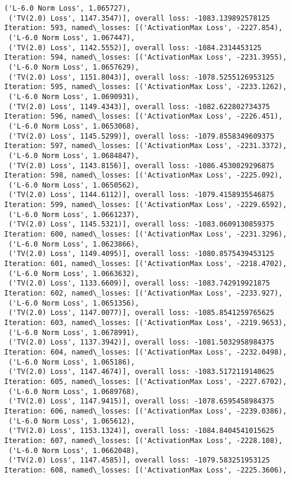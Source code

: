 \documentclass[10pt]{article}
\begin{document}
\begin{Verbatim}[commandchars=\\\{\}]
 ('L-6.0 Norm Loss', 1.065727),
 ('TV(2.0) Loss', 1147.3547)], overall loss: -1083.139892578125
Iteration: 593, named\_losses: [('ActivationMax Loss', -2227.854),
 ('L-6.0 Norm Loss', 1.067447),
 ('TV(2.0) Loss', 1142.5552)], overall loss: -1084.2314453125
Iteration: 594, named\_losses: [('ActivationMax Loss', -2231.3955),
 ('L-6.0 Norm Loss', 1.0657629),
 ('TV(2.0) Loss', 1151.8043)], overall loss: -1078.5255126953125
Iteration: 595, named\_losses: [('ActivationMax Loss', -2233.1262),
 ('L-6.0 Norm Loss', 1.0690931),
 ('TV(2.0) Loss', 1149.4343)], overall loss: -1082.622802734375
Iteration: 596, named\_losses: [('ActivationMax Loss', -2226.451),
 ('L-6.0 Norm Loss', 1.0653068),
 ('TV(2.0) Loss', 1145.5299)], overall loss: -1079.8558349609375
Iteration: 597, named\_losses: [('ActivationMax Loss', -2231.3372),
 ('L-6.0 Norm Loss', 1.0684847),
 ('TV(2.0) Loss', 1143.8156)], overall loss: -1086.4530029296875
Iteration: 598, named\_losses: [('ActivationMax Loss', -2225.092),
 ('L-6.0 Norm Loss', 1.0650562),
 ('TV(2.0) Loss', 1144.6112)], overall loss: -1079.4158935546875
Iteration: 599, named\_losses: [('ActivationMax Loss', -2229.6592),
 ('L-6.0 Norm Loss', 1.0661237),
 ('TV(2.0) Loss', 1145.5321)], overall loss: -1083.0609130859375
Iteration: 600, named\_losses: [('ActivationMax Loss', -2231.3296),
 ('L-6.0 Norm Loss', 1.0623866),
 ('TV(2.0) Loss', 1149.4095)], overall loss: -1080.8575439453125
Iteration: 601, named\_losses: [('ActivationMax Loss', -2218.4702),
 ('L-6.0 Norm Loss', 1.0663632),
 ('TV(2.0) Loss', 1133.6609)], overall loss: -1083.742919921875
Iteration: 602, named\_losses: [('ActivationMax Loss', -2233.927),
 ('L-6.0 Norm Loss', 1.0651356),
 ('TV(2.0) Loss', 1147.0077)], overall loss: -1085.8541259765625
Iteration: 603, named\_losses: [('ActivationMax Loss', -2219.9653),
 ('L-6.0 Norm Loss', 1.0678991),
 ('TV(2.0) Loss', 1137.3942)], overall loss: -1081.5032958984375
Iteration: 604, named\_losses: [('ActivationMax Loss', -2232.0498),
 ('L-6.0 Norm Loss', 1.065186),
 ('TV(2.0) Loss', 1147.4674)], overall loss: -1083.5172119140625
Iteration: 605, named\_losses: [('ActivationMax Loss', -2227.6702),
 ('L-6.0 Norm Loss', 1.0689768),
 ('TV(2.0) Loss', 1147.9415)], overall loss: -1078.6595458984375
Iteration: 606, named\_losses: [('ActivationMax Loss', -2239.0386),
 ('L-6.0 Norm Loss', 1.065612),
 ('TV(2.0) Loss', 1153.1324)], overall loss: -1084.8404541015625
Iteration: 607, named\_losses: [('ActivationMax Loss', -2228.108),
 ('L-6.0 Norm Loss', 1.0662048),
 ('TV(2.0) Loss', 1147.4585)], overall loss: -1079.583251953125
Iteration: 608, named\_losses: [('ActivationMax Loss', -2225.3606),

\end{Verbatim}
\end{document}

